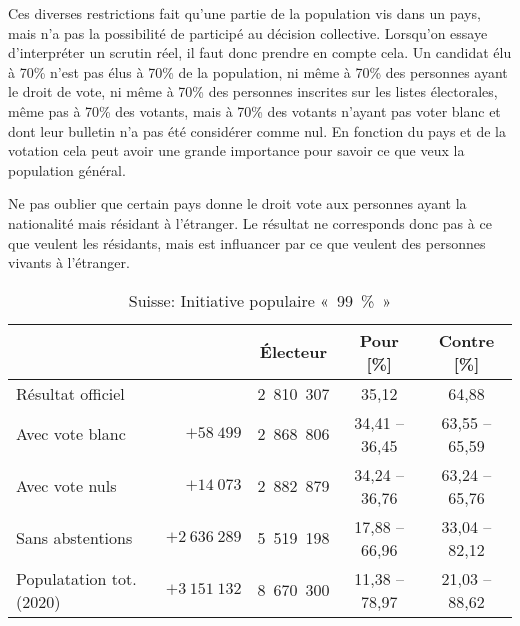 \documentclass[../report]{subfiles}
\begin{document}
  Ces diverses restrictions fait qu'une partie de la population vis dans un pays, mais n'a
  pas la possibilité de participé au décision collective.
  Lorsqu'on essaye d'interpréter un scrutin réel, il faut donc prendre en compte cela.
  Un candidat élu à 70\% n'est pas élus à 70\% de la population, ni même à 70\% des personnes
  ayant le droit de vote, ni même à 70\% des personnes inscrites sur les listes électorales,
  même pas à 70\% des votants, mais à 70\% des votants n'ayant pas voter blanc et dont leur 
  bulletin n'a pas été considérer comme nul.
  En fonction du pays et de la votation cela peut avoir une grande importance pour savoir ce que
  veux la population général.

  Ne pas oublier que certain pays donne le droit vote aux personnes ayant la nationalité mais 
  résidant à l'étranger.
  Le résultat ne corresponds donc pas à ce que veulent les résidants, mais est influancer par ce
  que veulent des personnes vivants à l'étranger.

  \begin{table}[h]
    \caption{Suisse: Initiative populaire «~99~\%~»}%
    \label{tab:votation:99pourcent}%
    \begin{center}
      \begin{tabular}{lrccc}
        \hline
        & & Électeur & Pour [\%] & Contre [\%] \\
        \hline
        \hline
        Résultat officiel        &              & 2~810~307 & 35,12          & 64,88          \\
        Avec vote blanc          & $+58~499$    & 2~868~806 & 34,41 -- 36,45 & 63,55 -- 65,59 \\
        Avec vote nuls           & $+14~073$    & 2~882~879 & 34,24 -- 36,76 & 63,24 -- 65,76 \\
        Sans abstentions         & $+2~636~289$ & 5~519~198 & 17,88 -- 66,96 & 33,04 -- 82,12 \\
        Populatation tot. (2020) & $+3~151~132$ & 8~670~300 & 11,38 -- 78,97 & 21,03 -- 88,62 \\
        \hline
      \end{tabular}
    \end{center}
  \end{table}
\end{document}
